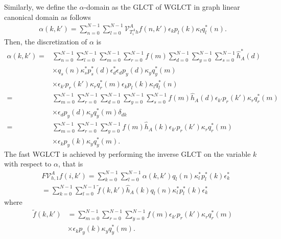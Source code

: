 \documentclass[lettersize,journal]{IEEEtran}
\begin{document}
Similarly, we define the $\alpha$-domain as the GLCT of WGLCT in graph linear canonical domain as follows
\begin{align}
	\alpha(k,k')
	= \sum_{n=0}^{N-1} \sum_{l=0}^{N-1}\mathcal{V}_{T_i^A h}^Af(n,k')  \epsilon_k p_l(k) \kappa_l q_l^*(n).
\end{align}
Then, the discretization of $\alpha$ is 
\begin{align}
	\alpha(k,k')
	=& \sum_{n=0}^{N-1} \sum_{l=0}^{N-1}
	\sum_{m=0}^{N-1} \sum_{r=0}^{N-1} f(m)
	\sum_{d=0}^{N-1} \sum_{y=0}^{N-1} \sum_{s=0}^{N-1} \hat{h}_{A}^*(d) \nonumber \\
	& \times
	q_s(n) \kappa_s^{*} p_s^*(d) \epsilon_{d}^{*}
	\epsilon_{d} p_y(d) \kappa_y q_y^*(m)
	\nonumber \\
	& \times 
	\epsilon_{k'} p_r(k') \kappa_r q_r^*(m) 
	\epsilon_k p_l(k) \kappa_l q_l^*(n) \nonumber \\
	= & \sum_{m=0}^{N-1} \sum_{r=0}^{N-1} 
	\sum_{d=0}^{N-1} \sum_{y=0}^{N-1} \sum_{s=0}^{N-1}
	f(m)  \hat{h}_{A}(d)
	\epsilon_{k'} p_r(k') \kappa_r q_r^*(m) \nonumber \\
	&\times
	\epsilon_{d} p_y(d) \kappa_y q_y^*(m)
	\delta_{dk}
	\nonumber \\
	= & \sum_{m=0}^{N-1}  \sum_{r=0}^{N-1} \sum_{y=0}^{N-1} 
	f(m)  \hat{h}_{A}(k)
	\epsilon_{k'} p_r(k') \kappa_r q_r^*(m) \nonumber \\
	&\times
	\epsilon_{k} p_y(k) \kappa_y q_y^*(m).
\end{align}
The fast WGLCT is achieved by performing the inverse GLCT on the variable $k$ with respect to $\alpha$, that is
\begin{align}
	&F\mathcal{V}_{h,1}^Af(i,k') 
	= \sum_{k=0}^{N-1} \sum_{l=0}^{N-1} \alpha(k,k')
	q_l(n) \kappa_l^{*} p_l^*(k) \epsilon_k^{*} \nonumber \\
	&= \sum_{k=0}^{N-1} \sum_{l=0}^{N-1} 
	\tilde{f}(k,k')  \hat{h}_{A}(k)
	q_l(n) \kappa_l^{*} p_l^*(k) \epsilon_k^{*}
\end{align}
where 
\begin{align}
	\tilde{f}(k,k') 
	&=\sum_{m=0}^{N-1}  \sum_{r=0}^{N-1} \sum_{y=0}^{N-1} f(m) \epsilon_{k'} p_r(k') \kappa_r q_r^*(m) \nonumber \\
	& \times \epsilon_{k} p_y(k) \kappa_y q_y^*(m).
\end{align}
\end{document}
